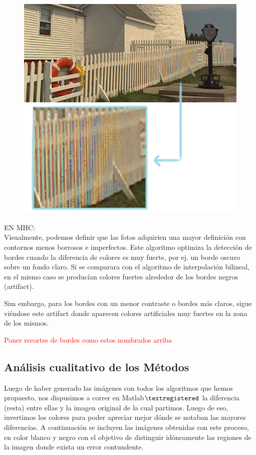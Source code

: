 \documentclass[a4paper]{article}
\begin{document}
\begin{figure}[h!]
	\caption{}
	\begin{center}
	\includegraphics[scale=0.1]{imagenes/cercosplineMHC}
	\label{cercosplineMHC}
  \end{center}
\end{figure}



EN MHC:\\

Visualmente, podemos definir que las fotos adquirien una mayor definici\'on con contornos menos borrosos e imperfectos. Este algoritmo optimiza la detecci\'on de bordes cuando la diferencia de colores es muy fuerte, por ej. un borde oscuro sobre un fondo claro. Si se comparara con el algoritmo de interpolaci\'on bilineal, en el mismo caso se produc\'ian colores fuertes alrededor de los bordes negros (artifact).

Sim embargo, para los bordes con un menor contraste o bordes m\'as claros, sigue vi\'endose este artifact donde aparecen colores artificiales muy fuertes en la zona de los mismos.

\textcolor{red}{Poner recortes de bordes como estos nombrados arriba}


\newpage
\subsection{An\'alisis cualitativo de los M\'etodos}
Luego de haber generado las im\'agenes con todos los algoritmos que hemos propuesto, nos dispusimos a correr en Matlab$\textregistered$  la diferencia (resta) entre ellas y la imagen original de la cual partimos. Luego de eso, invertimos los colores para poder apreciar mejor d\'onde se notaban las mayores diferencias. A continuaci\'on se incluyen las im\'agenes obtenidas con este proceso, en color blanco y negro con el objetivo de distinguir id\'oneamente las regiones de la imagen donde exista un error contundente.\\
\end{document}
